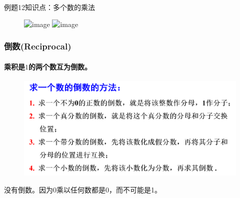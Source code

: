 \begin{frame}{例题12}{知识点：多个数的乘法}

    \begin{figure}
        \begin{flushleft}
            \includegraphics<1>[width=.9\textwidth]{assets/examp12.png}
            \includegraphics<2>[width=.9\textwidth]{assets/examp12-2.png}
        \end{flushleft}
        
    \end{figure}
\end{frame}

\begin{frame}
    \frametitle{倒数(Reciprocal)}
    \framesubtitle{乘积是$1$的两个数互为\alert{倒数}。}
    \begin{figure}
        \includegraphics[width=.9\textwidth]{assets/reciprocal.png}
    \end{figure}
    \alert{没有倒数。因为0乘以任何数都是0，而不可能是1。}
\end{frame}
